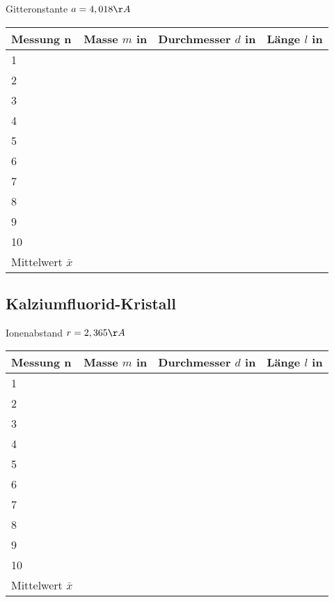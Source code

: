 \documentclass[11pt,a4paper,titlepage,headinclude,bibtotoc]{scrartcl}
\begin{document}
Gitteronstante $a= 4,018\AA$

\begin{table} [h!]
\centering
\begin{tabular}{|p{3 cm}||p{3 cm}|p{3 cm}|p{3 cm}|}
        \hline
		Messung n& Masse $m$ in & Durchmesser $d$ in & Länge $l$ in\\
         \hline 
         1& & &\\
          \hline 
         2& & &\\
          \hline 
         3& & &\\
          \hline 
         4& & &\\
          \hline 
         5& & &\\
          \hline 
         6& & &\\
          \hline 
         7& & &\\
          \hline 
         8& & &\\
          \hline 
         9& & &\\
          \hline 
         10& & &\\
         \hline
         Mittelwert $\bar{x}$ & & &\\
         \hline
\end{tabular}
\end{table}

\subsection*{Kalziumfluorid-Kristall}

Ionenabstand $r=2,365\AA$

\begin{table} [h!]
\centering
\begin{tabular}{|p{3 cm}||p{3 cm}|p{3 cm}|p{3 cm}|}
        \hline
		Messung n& Masse $m$ in & Durchmesser $d$ in & Länge $l$ in\\
         \hline 
         1& & &\\
          \hline 
         2& & &\\
          \hline 
         3& & &\\
          \hline 
         4& & &\\
          \hline 
         5& & &\\
          \hline 
         6& & &\\
          \hline 
         7& & &\\
          \hline 
         8& & &\\
          \hline 
         9& & &\\
          \hline 
         10& & &\\
         \hline
         Mittelwert $\bar{x}$ & & &\\
         \hline
\end{tabular}
\end{table}
\end{document}
